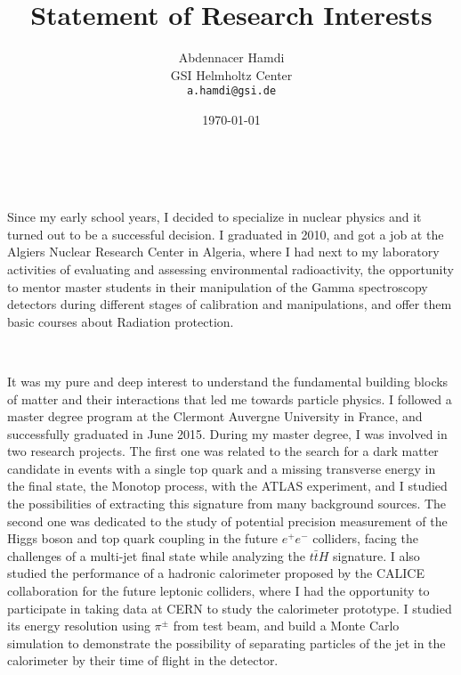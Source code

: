 \documentclass[a4paper]{article}
\title{Statement of Research Interests} %
\author{Abdennacer Hamdi\\
GSI Helmholtz Center\\
\texttt{a.hamdi@gsi.de}}
\date{\today}
\begin{document}
\fontsize{12}{15}
\selectfont
\maketitle


~\par Since my early school years, I decided to specialize in nuclear physics and it turned out to be a successful decision. I graduated in 2010, and got a job at the Algiers Nuclear Research Center in Algeria, where I had next to my laboratory activities of evaluating and assessing environmental radioactivity, the opportunity to mentor master students in their manipulation of the Gamma spectroscopy detectors during different stages of calibration and manipulations, and offer them basic courses about Radiation protection.

~\par It was my pure and deep interest to understand the fundamental building blocks of matter and their interactions that led me towards particle physics. I followed a master degree program at the Clermont Auvergne University in France, and successfully graduated in June 2015. During my master degree, I was involved in two research projects. The first one was related to the search for a dark matter candidate in events with a single top quark and a missing transverse energy in the final state, the Monotop process, with the ATLAS experiment, and I studied the possibilities of extracting this signature from many background sources. The second one was dedicated to  the study of potential precision measurement of the Higgs boson and top quark coupling in the future $e^+e^-$ colliders, facing the challenges of a multi-jet final state while analyzing the $t\bar{t}H$ signature. I also studied the performance of a hadronic calorimeter proposed by the CALICE collaboration for the future leptonic colliders, where I had the opportunity to participate in taking data at CERN to study the calorimeter prototype. I studied its energy resolution using $\pi^{\pm}$ from test beam, and build a Monte Carlo simulation to demonstrate the possibility of separating particles of the jet in the calorimeter by their time of flight in the detector.
\end{document}
